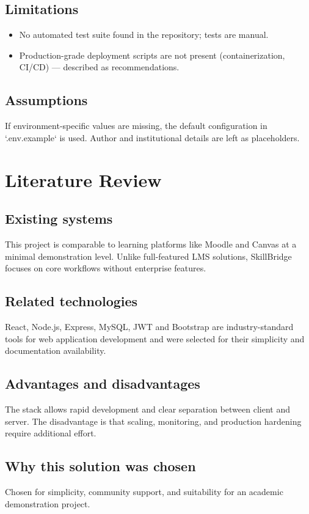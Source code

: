 \documentclass[12pt,a4paper]{report}
\begin{document}
\section{Limitations}
\begin{itemize}
  \item No automated test suite found in the repository; tests are manual.
  \item Production-grade deployment scripts are not present (containerization, CI/CD) — described as recommendations.
\end{itemize}

\section{Assumptions}
If environment-specific values are missing, the default configuration in `.env.example` is used. Author and institutional details are left as placeholders.

\clearpage

\chapter{Literature Review}
\section{Existing systems}
This project is comparable to learning platforms like Moodle and Canvas at a minimal demonstration level. Unlike full-featured LMS solutions, SkillBridge focuses on core workflows without enterprise features.

\section{Related technologies}
React, Node.js, Express, MySQL, JWT and Bootstrap are industry-standard tools for web application development and were selected for their simplicity and documentation availability.

\section{Advantages and disadvantages}
The stack allows rapid development and clear separation between client and server. The disadvantage is that scaling, monitoring, and production hardening require additional effort.

\section{Why this solution was chosen}
Chosen for simplicity, community support, and suitability for an academic demonstration project.
\end{document}
